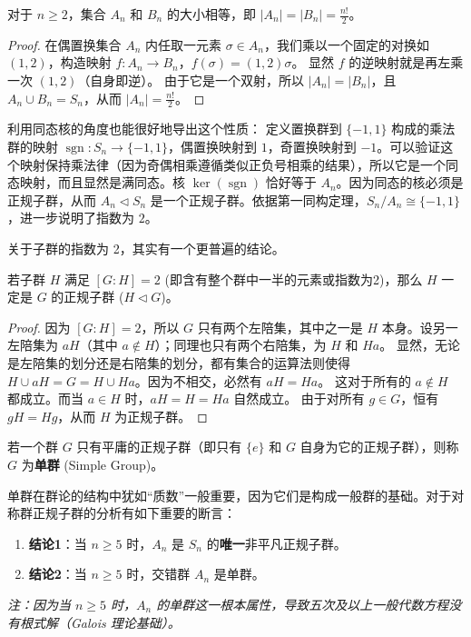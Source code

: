 \documentclass[11pt]{article}
\begin{document}
\begin{cnproperty}
    对于 $n \ge 2$，集合 $A_n$ 和 $B_n$ 的大小相等，即 $|A_n| = |B_n| = \frac{n!}{2}$。
\end{cnproperty}
\begin{proof}
    在偶置换集合 $A_n$ 内任取一元素 $\sigma \in A_n$，我们乘以一个固定的对换如 $(1, 2)$，构造映射 $f: A_n \to B_n$，$f(\sigma) = (1, 2)\sigma$。 显然 $f$ 的逆映射就是再左乘一次 $(1, 2)$（自身即逆）。
    由于它是一个双射，所以 $|A_n| = |B_n|$，且 $A_n \cup B_n = S_n$，从而 $|A_n| = \frac{n!}{2}$。
\end{proof}

利用同态核的角度也能很好地导出这个性质：
定义置换群到 $\{-1, 1\}$ 构成的乘法群的映射 $\operatorname{sgn}: S_n \to \{-1, 1\}$，偶置换映射到 $1$，奇置换映射到 $-1$。可以验证这个映射保持乘法律（因为奇偶相乘遵循类似正负号相乘的结果），所以它是一个同态映射，而且显然是满同态。核 $\operatorname{ker}(\operatorname{sgn})$ 恰好等于 $A_n$。因为同态的核必须是正规子群，从而 $A_n \triangleleft S_n$ 是一个正规子群。依据第一同构定理，$S_n / A_n \cong \{-1, 1\}$，进一步说明了指数为 $2$。

关于子群的指数为 2，其实有一个更普遍的结论。
\begin{cntheorem}
    若子群 $H$ 满足 $[G: H] = 2$ (即含有整个群中一半的元素或指数为2)，那么 $H$ 一定是 $G$ 的正规子群 ($H \triangleleft G$)。
\end{cntheorem}
\begin{proof}
    因为 $[G: H] = 2$，所以 $G$ 只有两个左陪集，其中之一是 $H$ 本身。设另一左陪集为 $aH$（其中 $a \notin H$）；同理也只有两个右陪集，为 $H$ 和 $Ha$。
    显然，无论是左陪集的划分还是右陪集的划分，都有集合的运算法则使得 $H \cup aH = G = H \cup Ha$。因为不相交，必然有 $aH = Ha$。
    这对于所有的 $a \notin H$ 都成立。而当 $a \in H$ 时，$aH = H = Ha$ 自然成立。
    由于对所有 $g \in G$，恒有 $gH = Hg$，从而 $H$ 为正规子群。
\end{proof}

\begin{cndefinition}[单群]
    若一个群 $G$ 只有平庸的正规子群（即只有 $\{e\}$ 和 $G$ 自身为它的正规子群），则称 $G$ 为\textbf{单群} (Simple Group)。
\end{cndefinition}
单群在群论的结构中犹如“质数”一般重要，因为它们是构成一般群的基础。对于对称群正规子群的分析有如下重要的断言：
\begin{cntheorem}
    \begin{enumerate}
    \item \textbf{结论1}：当 $n \ge 5$ 时，$A_n$ 是 $S_n$ 的\textbf{唯一}非平凡正规子群。
    \item \textbf{结论2}：当 $n \ge 5$ 时，交错群 $A_n$ 是单群。
    \end{enumerate}
\end{cntheorem}
\textit{注：因为当 $n \ge 5$ 时，$A_n$ 的单群这一根本属性，导致五次及以上一般代数方程没有根式解（Galois 理论基础）。}
\end{document}
